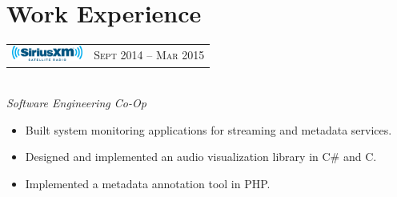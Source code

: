 \documentclass[10pt]{article}
\begin{document}
\color{text1} %




\par{\\ %
\vspace{0.5cm}
	

\begin{minipage}[t]{0.5\textwidth} %
\vspace{0pt} %


\section{Work Experience} 


\begin{tabular}{ L{5cm} R{3.5cm} }
\includegraphics[height=0.5cm]{siriusxm} & 
{\raggedleft\textsc{Sept 2014 -- Mar 2015}} \\
\end{tabular}
{\raggedright\large \\
\textit{Software Engineering Co-Op}\\[5pt]}

\begin{itemize}
  \setlength\itemsep{0.4mm}
  \item[\ding{226}] Built system monitoring applications for streaming and metadata services.
  \item[\ding{226}] Designed and implemented an audio visualization library in C\# and C.
  \item[\ding{226}] Implemented a metadata annotation tool in PHP.
\end{itemize}


\end{minipage}}
\end{document}
